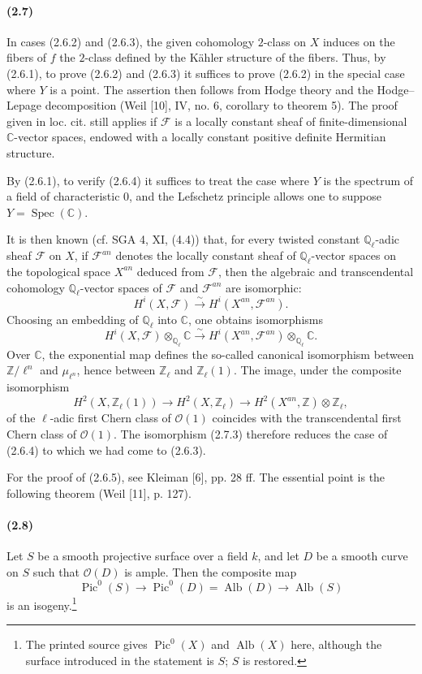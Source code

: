 \documentclass[10pt]{article}
\newcommand{\Z}{\mathbb Z}
\newcommand{\iso}{\xrightarrow{\sim}}
\providecommand{\C}{\mathbb C}
\providecommand{\Ql}{\mathbb Q_\ell}
\providecommand{\Zl}{\mathbb Z_\ell}
\providecommand{\Alb}{\operatorname{Alb}}
\providecommand{\Pic}{\operatorname{Pic}}
\providecommand{\Spec}{\operatorname{Spec}}
\begin{document}
\paragraph{(2.7)} In cases (2.6.2) and (2.6.3), the given cohomology $2$-class on $X$ induces on the fibers of $f$ the $2$-class defined by the Kähler structure of the fibers. Thus, by (2.6.1), to prove (2.6.2) and (2.6.3) it suffices to prove (2.6.2) in the special case where $Y$ is a point. The assertion then follows from Hodge theory and the Hodge--Lepage decomposition (Weil [10], IV, no. 6, corollary to theorem 5). The proof given in loc. cit. still applies if $\mathcal F$ is a locally constant sheaf of finite-dimensional $\C$-vector spaces, endowed with a locally constant positive definite Hermitian structure.

By (2.6.1), to verify (2.6.4) it suffices to treat the case where $Y$ is the spectrum of a field of characteristic $0$, and the Lefschetz principle allows one to suppose $Y=\Spec(\C)$.

It is then known (cf. SGA 4, XI, (4.4)) that, for every twisted constant $\Ql$-adic sheaf $\mathcal F$ on $X$, if $\mathcal F^{an}$ denotes the locally constant sheaf of $\Ql$-vector spaces on the topological space $X^{an}$ deduced from $\mathcal F$, then the algebraic and transcendental cohomology $\Ql$-vector spaces of $\mathcal F$ and $\mathcal F^{an}$ are isomorphic:
\[
\tag{2.7.2}
H^i(X,\mathcal F)\iso H^i(X^{an},\mathcal F^{an}).
\]
Choosing an embedding of $\Ql$ into $\C$, one obtains isomorphisms
\[
\tag{2.7.3}
H^i(X,\mathcal F)\otimes_{\Ql}\C\iso
H^i(X^{an},\mathcal F^{an})\otimes_{\Ql}\C.
\]
Over $\C$, the exponential map defines the so-called canonical isomorphism between $\Z/\ell^n$ and $\mu_{\ell^n}$, hence between $\Zl$ and $\Zl(1)$. The image, under the composite isomorphism
\[
H^2(X,\Zl(1))\longrightarrow H^2(X,\Zl)\longrightarrow H^2(X^{an},\Z)\otimes\Zl,
\]
of the $\ell$-adic first Chern class of $\mathcal O(1)$ coincides with the transcendental first Chern class of $\mathcal O(1)$. The isomorphism (2.7.3) therefore reduces the case of (2.6.4) to which we had come to (2.6.3).

For the proof of (2.6.5), see Kleiman [6], pp. 28 ff. The essential point is the following theorem (Weil [11], p. 127).

\paragraph{(2.8)} Let $S$ be a smooth projective surface over a field $k$, and let $D$ be a smooth curve on $S$ such that $\mathcal O(D)$ is ample. Then the composite map
\[
\Pic^0(S)\longrightarrow\Pic^0(D)=\Alb(D)\longrightarrow\Alb(S)
\]
is an isogeny.\footnote{The printed source gives $\Pic^0(X)$ and $\Alb(X)$ here, although the surface introduced in the statement is $S$; $S$ is restored.}
\end{document}
